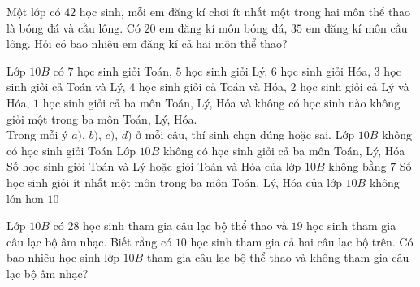 \begin{bt}%
	Một lớp có $42$ học sinh, mỗi em đăng kí chơi ít nhất một trong hai môn thể thao là bóng đá và cầu lông. Có $20$ em đăng kí môn bóng đá, $35$ em đăng kí môn cầu lông. Hỏi có bao nhiêu em đăng kí cả hai môn thể thao?
\end{bt}

\begin{ex}%
	Lớp $10B$ có $7$ học sinh giỏi Toán, $5$ học sinh giỏi Lý, $6$ học sinh giỏi Hóa, $3$ học sinh giỏi cả Toán và Lý, $4$ học sinh giỏi cả Toán và Hóa, $2$ học sinh giỏi cả Lý và Hóa, $1$ học sinh giỏi cả ba môn Toán, Lý, Hóa và không có học sinh nào không giỏi một trong ba môn Toán, Lý, Hóa.\\
	Trong mỗi ý $a)$, $b)$, $c)$, $d)$ ở mỗi câu, thí sinh chọn đúng hoặc sai.
	\choiceTF
	{Lớp $10B$ không có học sinh giỏi Toán}
	{Lớp $10B$ không có học sinh giỏi cả ba môn Toán, Lý, Hóa}
	{\True Số học sinh giỏi Toán và Lý hoặc giỏi Toán và Hóa của lớp $10B$ không bằng $7$}
	{ Số học sinh giỏi ít nhất một môn trong ba môn Toán, Lý, Hóa của lớp $10B$ không lớn hơn $10$}
\end{ex}

\begin{bt}%
	Lớp $10B$ có $28$ học sinh tham gia câu lạc bộ thể thao và $19$ học sinh tham gia câu lạc bộ âm nhạc. Biết rằng có $10$ học sinh tham gia cả hai câu lạc bộ trên. Có bao nhiêu học sinh lớp $10B$ tham gia câu lạc bộ thể thao và không tham gia câu lạc bộ âm nhạc?\par
\end{bt}

